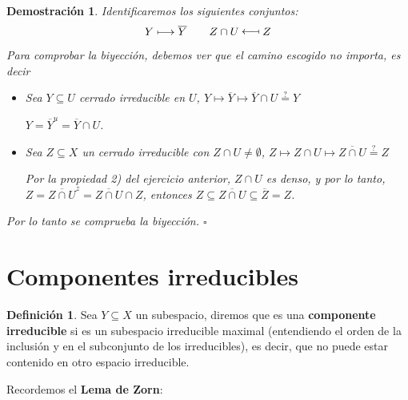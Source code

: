 \documentclass[12pt,twoside]{report}
\newcommand\longmapsfrom{\rotatebox[origin=c]{180}{$\longmapsto$}}
\theoremstyle{azul}
\newtheorem*{demx}{Demostración}
\theoremstyle{azul2}
\theoremstyle{plain}
\theoremstyle{definition}
\newtheorem*{defi}{Definición}
\theoremstyle{remark}
\begin{document}
\begin{demx}
Identificaremos los siguientes conjuntos:
$$Y \longmapsto \overline{Y} \qquad Z \cap U \: {\lower -2pt \hbox{\longmapsfrom}} \; Z $$
Para comprobar la biyección, debemos ver que el camino escogido no importa, es decir 
\begin{itemize}
    \item Sea $Y \subseteq U$ cerrado irreducible en $U$, $Y \longmapsto \overline{Y} \longmapsto \overline{Y} \cap U \stackrel{?}{=} Y$
    
    $Y = \overline{Y}^{u} = \overline{Y} \cap U$.
    \item Sea $Z \subseteq X$ un cerrado irreducible con $Z \cap U \neq \emptyset$, $Z \longmapsto Z \cap U \longmapsto \overline{Z \cap U} \stackrel{?}{=} Z$
    
    Por la propiedad \textit{2)} del ejercicio anterior, $Z \cap U$ es denso, y por lo tanto, $Z=\overline{Z \cap U}^z = \overline{Z \cap U} \cap Z$, entonces $Z \subseteq \overline{Z \cap U} \subseteq \overline{Z} = Z$.
\end{itemize}
Por lo tanto se comprueba la biyección. \hfill $\square$
\end{demx}
    
\section{{Componentes irreducibles}} \justifying
\begin{defi}
Sea $Y \subseteq X$ un subespacio, diremos que es una \textbf{componente irreducible} si es un subespacio irreducible maximal (entendiendo el orden de la inclusión y en el subconjunto de los irreducibles), es decir, que no puede estar contenido en otro espacio irreducible. 
\end{defi}
Recordemos el \textbf{{Lema de Zorn}}:
\end{document}
